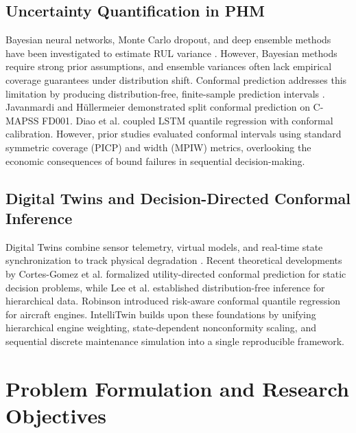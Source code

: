\documentclass[conference,a4paper]{IEEEtran}
\begin{document}
\subsection{Uncertainty Quantification in PHM}
Bayesian neural networks, Monte Carlo dropout, and deep ensemble methods have been investigated to estimate RUL variance \cite{chen2022data, xu2026novel}. However, Bayesian methods require strong prior assumptions, and ensemble variances often lack empirical coverage guarantees under distribution shift. Conformal prediction addresses this limitation by producing distribution-free, finite-sample prediction intervals \cite{javanmardi2023conformal}. Javanmardi and H\"ullermeier \cite{javanmardi2023conformal} demonstrated split conformal prediction on C-MAPSS FD001. Diao et al. \cite{diao2026turbofan} coupled LSTM quantile regression with conformal calibration. However, prior studies evaluated conformal intervals using standard symmetric coverage (PICP) and width (MPIW) metrics, overlooking the economic consequences of bound failures in sequential decision-making.

\subsection{Digital Twins and Decision-Directed Conformal Inference}
Digital Twins combine sensor telemetry, virtual models, and real-time state synchronization to track physical degradation \cite{huang2021survey, hasan2025new, pathri2025smart}. Recent theoretical developments by Cortes-Gomez et al. \cite{cortesgomez2025utility} formalized utility-directed conformal prediction for static decision problems, while Lee et al. \cite{lee2023hierarchical} established distribution-free inference for hierarchical data. Robinson \cite{robinson2026riskaware} introduced risk-aware conformal quantile regression for aircraft engines. IntelliTwin builds upon these foundations by unifying hierarchical engine weighting, state-dependent nonconformity scaling, and sequential discrete maintenance simulation into a single reproducible framework.

\section{Problem Formulation and Research Objectives}
\end{document}

